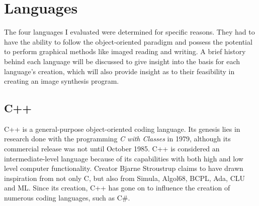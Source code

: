 \section{Languages}
The four languages I evaluated were determined for specific reasons.  They had to have the ability to follow the object-oriented paradigm and possess the potential to perform graphical methods like imaged reading and writing.  A brief history behind each language will be discussed to give insight into the basis for each language's creation, which will also provide insight as to their feasibility in creating an image synthesis program.
\subsection{C++}
\label{sub:C++}
C++ is a general-purpose object-oriented coding language.  Its genesis lies in research done with the programming \textit{C with Classes} in 1979, although its commercial release was not until October 1985\cite{stroustrup1996history}. C++ is considered an intermediate-level language because of its capabilities with both high and low level computer functionality.  Creator Bjarne Stroustrup claims to have drawn inspiration from not only C, but also from Simula, Algol68, BCPL, Ada, CLU and ML.  Since its creation, C++ has gone on to influence the creation of numerous coding languages, such as C\#\cite{naugler2007c}.

